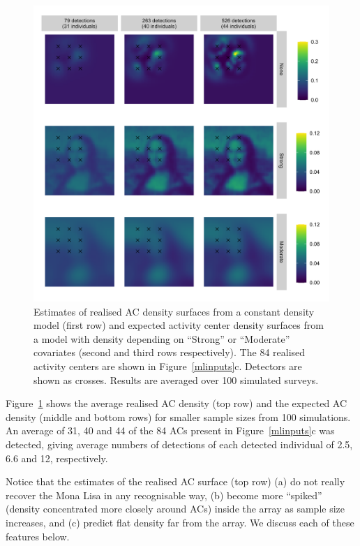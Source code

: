 \documentclass[10pt,a4paper]{article}
\begin{document}
\begin{figure}[htbp]
\centering
\includegraphics[width=1\textwidth]{mona_peaky_avgd.png}
\caption{Estimates of realised AC density surfaces from a constant density model (first row) and expected activity center density surfaces from a model with density depending on ``Strong'' or ``Moderate'' covariates (second and third rows respectively). The 84 realised activity centers are shown in Figure~\ref{mlinputs}c. Detectors are shown as crosses. Results are averaged over 100 simulated surveys.}
\label{mona_peaky_avgd}
\end{figure}

Figure~\ref{mona_peaky_avgd} shows the average realised AC density (top row) and the expected AC density (middle and bottom rows) for smaller sample sizes  from 100 simulations. An average of 31, 40 and 44 of the 84 ACs present in Figure~\ref{mlinputs}c was detected, giving average numbers of detections of each detected individual of 2.5, 6.6 and 12, respectively.

Notice that the estimates of the realised AC surface (top row) (a) do not really recover the Mona Lisa in any recognisable way, (b) become more ``spiked'' (density concentrated more closely around ACs) inside the array as sample size increases, and (c) predict flat density far from the array. We discuss each of these features below.
\end{document}

